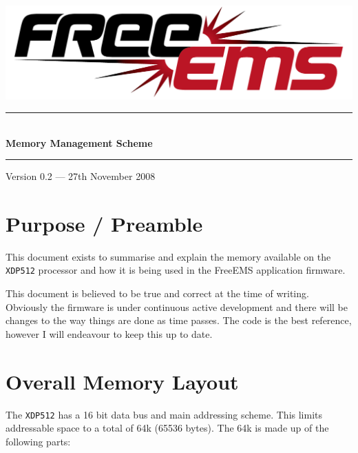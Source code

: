 \documentclass[12pt,a4wide,titlepage]{article}
\newcommand{\HRule}{\rule{\linewidth}{0.5mm}}
\begin{document}
\begin{titlepage} 
\begin{center}

\includegraphics[width=1\textwidth]{./logos/freeems}\\[1cm] \vfill

\HRule \\[0.8cm]
{ \huge \bfseries Memory Management Scheme}\\[0.4cm]
\HRule \vfill

\Large 

{\large Version 0.2 --- 27th November 2008}

\end{center}
\end{titlepage} 


\tableofcontents
\newpage


\setlength{\parindent}{0.0in}
\parskip 12pt


\section {Purpose / Preamble} 

This document exists to summarise and explain the memory available on the
\texttt{XDP512} processor and how it is being used in the FreeEMS application
firmware.

This document is believed to be true and correct at the time of writing.
Obviously the firmware is under continuous active development and there will
be changes to the way things are done as time passes. The code is the best
reference, however I will endeavour to keep this up to date.




\section{Overall Memory Layout}

The \texttt{XDP512} has a 16 bit data bus and main addressing scheme. This
limits addressable space to a total of 64k (65536 bytes). The 64k is made up of
the following parts:
\end{document}
